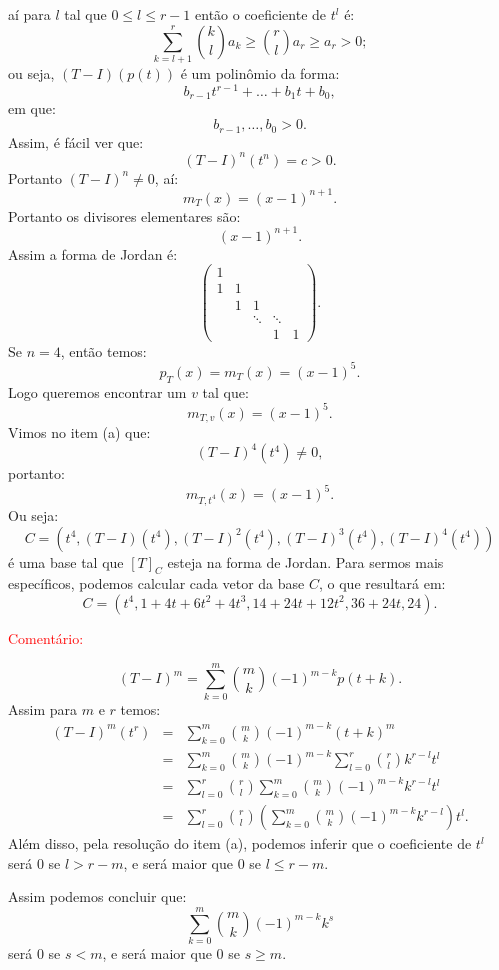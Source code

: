 \documentclass[11pt,a4paper]{article}
\begin{document}
aí para $l$ tal que $0\leq l\leq r-1$ então o coeficiente de $t^l$ é:
\[
\sum_{k=l+1}^r\binom{k}{l}a_k\geq\binom{r}{l}a_r\geq a_r>0;
\]
ou seja, $(T-I)(p(t))$ é um polinômio da forma:
\[
b_{r-1}t^{r-1}+\dots+b_1t+b_0,
\]
em que:
\[
b_{r-1},\dots,b_0>0.
\]
Assim, é fácil ver que:
\[
(T-I)^n(t^n)=c>0.
\]
Portanto $(T-I)^n\neq 0$, aí:
\[
m_T(x)=(x-1)^{n+1}.
\]
Portanto os divisores elementares são:
\[
(x-1)^{n+1}.
\]
Assim a forma de Jordan é:
\[
\begin{pmatrix}
1&&&&\\1&1&&&\\&1&1&&\\&&\ddots&\ddots&\\&&&1&1
\end{pmatrix}.
\]
\dividiritens{\task[\pers{b}]}
Se $n=4$, então temos:
\[
p_T(x)=m_T(x)=(x-1)^5.
\]
Logo queremos encontrar um $v$ tal que:
\[
m_{T,v}(x)=(x-1)^5.
\]
Vimos no item (a) que:
\[
(T-I)^4(t^4)\neq 0,
\]
portanto:
\[
m_{T,t^4}(x)=(x-1)^5.
\]
Ou seja:
\[
C=\left(t^4,(T-I)(t^4),(T-I)^2(t^4),(T-I)^3(t^4),(T-I)^4(t^4)\right)
\]
é uma base tal que $[T]_C$ esteja na forma de Jordan. Para sermos mais específicos, podemos calcular cada vetor da base $C$, o que resultará em:
\[
C=\left(t^4,1+4t+6t^2+4t^3,14+24t+12t^2,36+24t,24\right).
\]


\bigskip
\noindent
\textcolor{red}{Comentário:}

\[
(T-I)^m=\sum_{k=0}^m\binom{m}{k}(-1)^{m-k}p\left(t+k\right).
\]
Assim para $m$ e $r$ temos:
\[
\begin{array}{rcl}
(T-I)^m(t^r)&=&\sum\limits_{k=0}^m\binom{m}{k}(-1)^{m-k}(t+k)^m\\
&=&\sum\limits_{k=0}^m\binom{m}{k}(-1)^{m-k}\sum\limits_{l=0}^r\binom{r}{l}k^{r-l}t^l\\
&=&\sum\limits_{l=0}^r\binom{r}{l}\sum\limits_{k=0}^m\binom{m}{k}(-1)^{m-k}k^{r-l}t^l\\
&=&\sum\limits_{l=0}^r\binom{r}{l}\left(\sum\limits_{k=0}^m\binom{m}{k}(-1)^{m-k}k^{r-l}\right)t^l.
\end{array}
\]
Além disso, pela resolução do item (a), podemos inferir que o coeficiente de $t^l$ será $0$ se $l>r-m$, e será maior que $0$ se $l\leq r-m.$

\medskip
\noindent
Assim podemos concluir que:
\[
\sum\limits_{k=0}^m\binom{m}{k}(-1)^{m-k}k^s
\]
será $0$ se $s<m$, e será maior que $0$ se $s\geq m$.
\end{document}
